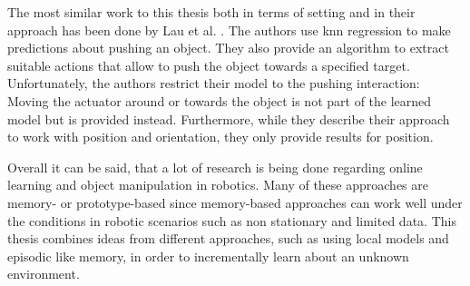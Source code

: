 The most similar work to this thesis both in terms of setting and in their approach has been done by 
Lau et al. \cite{pushing}. The authors use \gls{knn} regression to make predictions about pushing an object. They also provide an algorithm to extract suitable actions that allow to push the object towards a specified target. Unfortunately, the authors restrict their model to the pushing interaction: Moving the actuator around or towards the object is not part of the learned model but is provided instead. Furthermore, while they describe their approach to work with position and orientation, they only provide results for position. 

Overall it can be said, that a lot of research is being done regarding online learning and object manipulation in robotics. Many of these approaches are memory- or prototype-based since memory-based approaches can work well under the conditions in robotic scenarios such as non stationary and limited data. 
This thesis combines ideas from different approaches, such as using local models and episodic like memory, in order to incrementally learn about an unknown environment.

